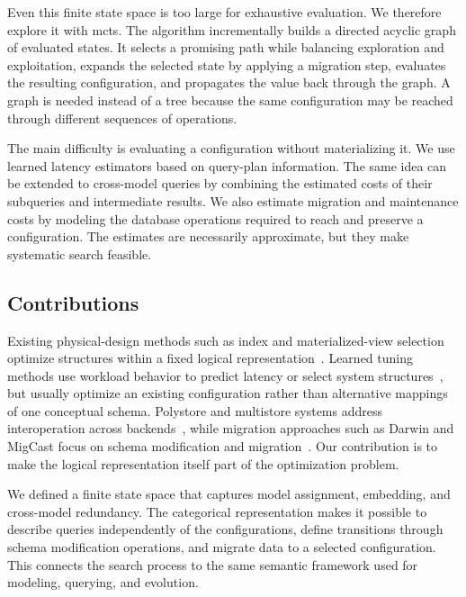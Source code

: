 Even this finite state space is too large for exhaustive evaluation. We therefore explore it with \acrshort{mcts}. The algorithm incrementally builds a directed acyclic graph of evaluated states. It selects a promising path while balancing exploration and exploitation, expands the selected state by applying a migration step, evaluates the resulting configuration, and propagates the value back through the graph. A graph is needed instead of a tree because the same configuration may be reached through different sequences of operations.

The main difficulty is evaluating a configuration without materializing it. We use learned latency estimators based on query-plan information. The same idea can be extended to cross-model queries by combining the estimated costs of their subqueries and intermediate results. We also estimate migration and maintenance costs by modeling the database operations required to reach and preserve a configuration. The estimates are necessarily approximate, but they make systematic search feasible.

\subsection{Contributions}

Existing physical-design methods such as index and materialized-view selection optimize structures within a fixed logical representation~\citep{10.1145/3183713.3199671}. Learned tuning methods use workload behavior to predict latency or select system structures~\citep{10.14778/3342263.3342646, 10.1155/2023/8835111, 10.1007/s10844-022-00762-0}, but usually optimize an existing configuration rather than alternative mappings of one conceptual schema. Polystore and multistore systems address interoperation across backends~\citep{alotaibi2020estocada, DBLP:journals/ijcc/BondiombouyV16, 10.1145/3417990.3421999}, while migration approaches such as Darwin and MigCast focus on schema modification and migration~\citep{storl2022darwin, hillenbrand2019migcast}. Our contribution is to make the logical representation itself part of the optimization problem.

We defined a finite state space that captures model assignment, embedding, and cross-model redundancy. The categorical representation makes it possible to describe queries independently of the configurations, define transitions through schema modification operations, and migrate data to a selected configuration. This connects the search process to the same semantic framework used for modeling, querying, and evolution.

